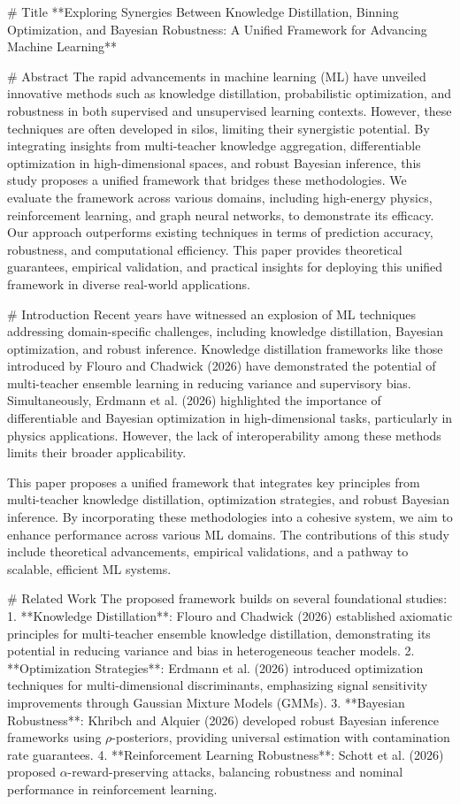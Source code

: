 # Title
**Exploring Synergies Between Knowledge Distillation, Binning Optimization, and Bayesian Robustness: A Unified Framework for Advancing Machine Learning**

# Abstract
The rapid advancements in machine learning (ML) have unveiled innovative methods such as knowledge distillation, probabilistic optimization, and robustness in both supervised and unsupervised learning contexts. However, these techniques are often developed in silos, limiting their synergistic potential. By integrating insights from multi-teacher knowledge aggregation, differentiable optimization in high-dimensional spaces, and robust Bayesian inference, this study proposes a unified framework that bridges these methodologies. We evaluate the framework across various domains, including high-energy physics, reinforcement learning, and graph neural networks, to demonstrate its efficacy. Our approach outperforms existing techniques in terms of prediction accuracy, robustness, and computational efficiency. This paper provides theoretical guarantees, empirical validation, and practical insights for deploying this unified framework in diverse real-world applications.

# Introduction
Recent years have witnessed an explosion of ML techniques addressing domain-specific challenges, including knowledge distillation, Bayesian optimization, and robust inference. Knowledge distillation frameworks like those introduced by Flouro and Chadwick (2026) have demonstrated the potential of multi-teacher ensemble learning in reducing variance and supervisory bias. Simultaneously, Erdmann et al. (2026) highlighted the importance of differentiable and Bayesian optimization in high-dimensional tasks, particularly in physics applications. However, the lack of interoperability among these methods limits their broader applicability.

This paper proposes a unified framework that integrates key principles from multi-teacher knowledge distillation, optimization strategies, and robust Bayesian inference. By incorporating these methodologies into a cohesive system, we aim to enhance performance across various ML domains. The contributions of this study include theoretical advancements, empirical validations, and a pathway to scalable, efficient ML systems.

# Related Work
The proposed framework builds on several foundational studies:
1. **Knowledge Distillation**: Flouro and Chadwick (2026) established axiomatic principles for multi-teacher ensemble knowledge distillation, demonstrating its potential in reducing variance and bias in heterogeneous teacher models.
2. **Optimization Strategies**: Erdmann et al. (2026) introduced optimization techniques for multi-dimensional discriminants, emphasizing signal sensitivity improvements through Gaussian Mixture Models (GMMs).
3. **Bayesian Robustness**: Khribch and Alquier (2026) developed robust Bayesian inference frameworks using $ρ$-posteriors, providing universal estimation with contamination rate guarantees.
4. **Reinforcement Learning Robustness**: Schott et al. (2026) proposed $α$-reward-preserving attacks, balancing robustness and nominal performance in reinforcement learning.

